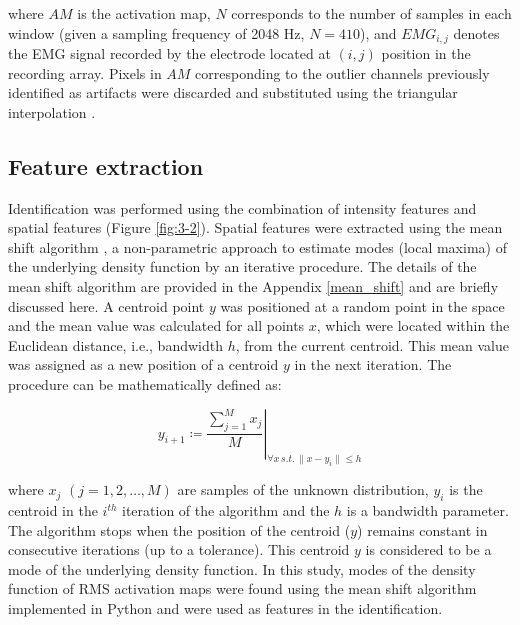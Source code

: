 where $AM$ is the activation map, $N$ corresponds to the number of samples in each window (given a sampling frequency of 2048 Hz, $N = 410$), and $EMG_{i,j}$ denotes the EMG signal recorded by the electrode located at $(i,j)$ position in the recording array. Pixels in $AM$ corresponding to the outlier channels previously identified as artifacts were discarded and substituted using the triangular interpolation \citep{Rojas-Martinez2012}. %


\subsection{Feature extraction}
Identification was performed using the combination of intensity features and spatial features (Figure \ref{fig:3-2}). Spatial features were extracted using the mean shift algorithm \citep{Comaniciu2002}, a non-parametric approach to estimate modes (local maxima) of the underlying density function by an iterative procedure. The details of the mean shift algorithm are provided in the Appendix \ref{mean_shift} and are briefly discussed here. A centroid point $y$ was positioned at a random point in the space and the mean value was calculated for all points $x$, which were located within the Euclidean distance, i.e., bandwidth $h$, from the current centroid. This mean value was assigned as a new position of a centroid $y$ in the next iteration. The procedure can be mathematically defined as:

\begin{equation} \label{eq:3-2}
\left. y_{i+1} \coloneqq \frac{\sum_{j=1}^{M} x_j}{M} \right\vert_{\forall x \,s.t. \,\parallel x-y_i \parallel \leq h}
\end{equation}

where $x_j$ $(j = 1, 2, …, M)$ are samples of the unknown distribution, $y_i$ is the centroid in the $i^{th}$ iteration of the algorithm and the $h$ is a bandwidth parameter. The algorithm stops when the position of the centroid ($y$) remains constant in consecutive iterations (up to a tolerance). This centroid $y$ is considered to be a mode of the underlying density function. In this study, modes of the density function of RMS activation maps were found using the mean shift algorithm implemented in Python \citep{scikit-learn} and were used as features in the identification.

